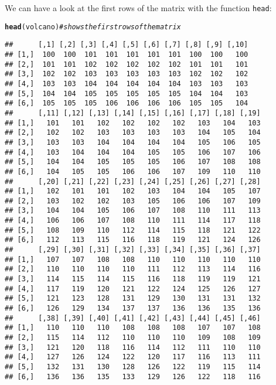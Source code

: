 \documentclass[12pt,a4paper]{scrartcl}\usepackage[]{graphicx}\usepackage[]{color}
\makeatletter
\newcommand{\hlcom}[1]{\textcolor[rgb]{0.678,0.584,0.686}{\textit{#1}}}%
\newcommand{\hlstd}[1]{\textcolor[rgb]{0.345,0.345,0.345}{#1}}%
\newcommand{\hlkwd}[1]{\textcolor[rgb]{0.737,0.353,0.396}{\textbf{#1}}}%
\newenvironment{kframe}{%
 \def\at@end@of@kframe{}%
 \ifinner\ifhmode%
  \def\at@end@of@kframe{\end{minipage}}%
  \begin{minipage}{\columnwidth}%
 \fi\fi%
 \def\FrameCommand##1{\hskip\@totalleftmargin \hskip-\fboxsep
 \colorbox{shadecolor}{##1}\hskip-\fboxsep
     \hskip-\linewidth \hskip-\@totalleftmargin \hskip\columnwidth}%
 \MakeFramed {\advance\hsize-\width
   \@totalleftmargin\z@ \linewidth\hsize
   \@setminipage}}%
 {\par\unskip\endMakeFramed%
 \at@end@of@kframe}
\newenvironment{knitrout}{}{} %
\makeatother
\begin{document}
We can have a look at the first rows of the matrix with the function \texttt{head}:
\begin{knitrout}
\color{fgcolor}\begin{kframe}
\begin{alltt}
\hlkwd{head}\hlstd{(volcano)}\hlcom{#shows the first rows of the matrix}
\end{alltt}
\begin{verbatim}
##      [,1] [,2] [,3] [,4] [,5] [,6] [,7] [,8] [,9] [,10]
## [1,]  100  100  101  101  101  101  101  100  100   100
## [2,]  101  101  102  102  102  102  102  101  101   101
## [3,]  102  102  103  103  103  103  103  102  102   102
## [4,]  103  103  104  104  104  104  104  103  103   103
## [5,]  104  104  105  105  105  105  105  104  104   103
## [6,]  105  105  105  106  106  106  106  105  105   104
##      [,11] [,12] [,13] [,14] [,15] [,16] [,17] [,18] [,19]
## [1,]   101   101   102   102   102   102   103   104   103
## [2,]   102   102   103   103   103   103   104   105   104
## [3,]   103   103   104   104   104   104   105   106   105
## [4,]   103   104   104   104   105   105   106   107   106
## [5,]   104   104   105   105   105   106   107   108   108
## [6,]   104   105   105   106   106   107   109   110   110
##      [,20] [,21] [,22] [,23] [,24] [,25] [,26] [,27] [,28]
## [1,]   102   101   101   102   103   104   104   105   107
## [2,]   103   102   102   103   105   106   106   107   109
## [3,]   104   104   105   106   107   108   110   111   113
## [4,]   106   106   107   108   110   111   114   117   118
## [5,]   108   109   110   112   114   115   118   121   122
## [6,]   112   113   115   116   118   119   121   124   126
##      [,29] [,30] [,31] [,32] [,33] [,34] [,35] [,36] [,37]
## [1,]   107   107   108   108   110   110   110   110   110
## [2,]   110   110   110   110   111   112   113   114   116
## [3,]   114   115   114   115   116   118   119   119   121
## [4,]   117   119   120   121   122   124   125   126   127
## [5,]   121   123   128   131   129   130   131   131   132
## [6,]   126   129   134   137   137   136   136   135   136
##      [,38] [,39] [,40] [,41] [,42] [,43] [,44] [,45] [,46]
## [1,]   110   110   110   108   108   108   107   107   108
## [2,]   115   114   112   110   110   110   109   108   109
## [3,]   121   120   118   116   114   112   111   110   110
## [4,]   127   126   124   122   120   117   116   113   111
## [5,]   132   131   130   128   126   122   119   115   114
## [6,]   136   136   135   133   129   126   122   118   116

\end{verbatim}
\end{kframe}
\end{knitrout}
\end{document}
